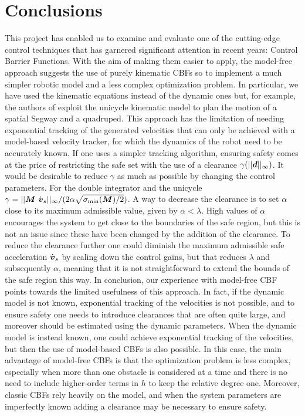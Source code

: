 \section*{Conclusions}
This project has enabled us to examine and evaluate one of the cutting-edge control techniques that has garnered significant attention in recent years: Control Barrier Functions. 
With the aim of making them easier to apply, the model-free approach suggests the use of purely kinematic CBFs so to implement a much simpler robotic model and a less complex optimization problem. 
In particular, we have used the kinematic equations instead of the dynamic ones but, for example, the authors of \cite{mfcbf} exploit the unicycle kinematic model to plan the motion of a spatial Segway and a quadruped. This approach has the limitation of needing exponential tracking of the generated velocities
that can only be achieved with a model-based velocity tracker, for which the dynamics of the robot need to be accurately known. If one uses a simpler tracking algorithm, ensuring safety comes at the price of restricting the safe set with the use of a clearance $\gamma(||\boldsymbol{d}||_{\infty})$. 
It would be desirable to reduce $\gamma$ as much as possible by changing the control parameters. 
For the double integrator and the unicycle $\gamma = ||\boldsymbol{M}~\dot{\boldsymbol{v}}_s ||_{\infty} / (2\alpha\sqrt{\sigma_{\min}(\boldsymbol{M})/2})$. 
A way to decrease the clearance is to set $\alpha$ close to its maximum admissible value, given by $\alpha < \lambda$.
High values of $\alpha$ encourages the system to get close to the boundaries of the safe region, but this is not an issue since these have been changed by the addition of the clearance. 
To reduce the clearance further one could diminish the maximum admissible safe acceleration $\dot{\boldsymbol{v}}_s$ by scaling down the control gains, but that reduces $\lambda$ and subsequently $\alpha$, meaning that it is not straightforward to extend the bounds of the safe region this way.
In conclusion, our experience with model-free CBF points towards the limited usefulness of this approach. In fact, if the dynamic model is not known, exponential tracking of the velocities is not possible, and to ensure safety one needs to introduce clearances that are often quite large, and moreover should be estimated using the dynamic parameters. 
When the dynamic model is instead known, one could achieve exponential tracking of the velocities, but then the use of model-based CBFs is also possible. In this case, the main advantage of model-free CBFs is that the optimization problem is less complex, especially when more than one obstacle is considered at a time and there is no need to include higher-order terms in $h$ to keep the relative degree one. Moreover, classic CBFs rely heavily on the model, and  when the system parameters are imperfectly known
adding a clearance
may be necessary to ensure safety.